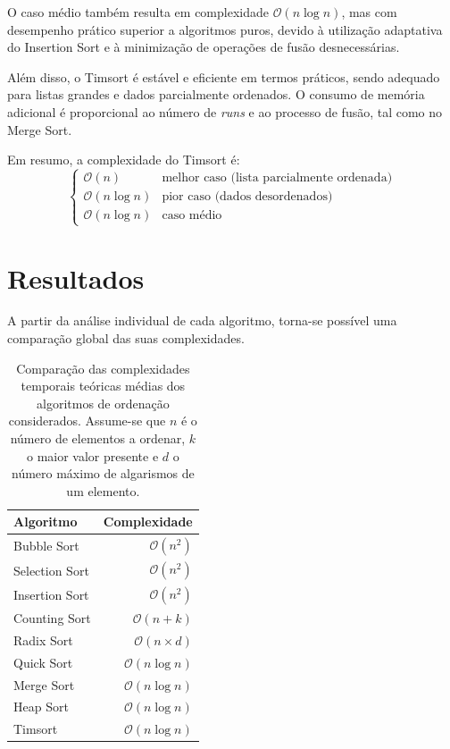 \documentclass[conference]{IEEEtran}
\begin{document}
O caso médio também resulta em complexidade \(\mathcal{O}(n \log n)\), mas com desempenho prático superior a algoritmos puros, devido à utilização adaptativa do Insertion Sort e à minimização de operações de fusão desnecessárias.

Além disso, o Timsort é estável e eficiente em termos práticos, sendo adequado para listas grandes e dados parcialmente ordenados. O consumo de memória adicional é proporcional ao número de \textit{runs} e ao processo de fusão, tal como no Merge Sort.

Em resumo, a complexidade do Timsort é:
\[
\begin{cases}
\mathcal{O}(n) & \text{melhor caso (lista parcialmente ordenada)} \\
\mathcal{O}(n \log n) & \text{pior caso (dados desordenados)} \\
\mathcal{O}(n \log n) & \text{caso médio}
\end{cases}
\]

\section{Resultados}

A partir da análise individual de cada algoritmo, torna-se possível uma comparação global das suas complexidades.

\begin{table}[H]
\centering
\caption{Comparação das complexidades temporais teóricas médias dos algoritmos de ordenação considerados. Assume-se que \( n \) é o número de elementos a ordenar, \( k \) o maior valor presente e \( d \) o número máximo de algarismos de um elemento.}
\label{tab:complexidades}
\begin{tabular}{lr}
\toprule
\textbf{Algoritmo} & \textbf{Complexidade} \\
\midrule
Bubble Sort & $\mathcal{O}(n^2)$ \\
Selection Sort & $\mathcal{O}(n^2)$ \\
Insertion Sort & $\mathcal{O}(n^2)$ \\
Counting Sort & $\mathcal{O}(n + k)$ \\
Radix Sort & $\mathcal{O}(n \times d)$ \\
Quick Sort & $\mathcal{O}(n \log n)$ \\
Merge Sort & $\mathcal{O}(n \log n)$ \\
Heap Sort & $\mathcal{O}(n \log n)$ \\
Timsort & $\mathcal{O}(n \log n)$ \\
\bottomrule
\end{tabular}
\end{table}
\end{document}
